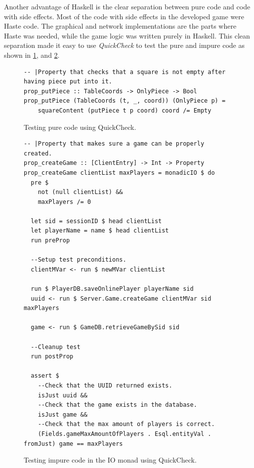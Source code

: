 \documentclass[a4paper]{article}
\begin{document}
Another advantage of Haskell is the clear separation between pure code and code with side effects. Most of the code with side effects in the developed game were Haste code. The graphical and network implementations are the parts where Haste was needed, while the game logic was written purely in Haskell. This clean separation made it easy to use \textit{QuickCheck} to test the pure and impure code as shown in \cref{fig:quickchecking}, and \cref{fig:quickcheck-monadic}.

\begin{figure}[ht!]
    \begin{lstlisting}
-- |Property that checks that a square is not empty after having piece put into it.
prop_putPiece :: TableCoords -> OnlyPiece -> Bool
prop_putPiece (TableCoords (t, _, coord)) (OnlyPiece p) =
    squareContent (putPiece t p coord) coord /= Empty
    \end{lstlisting}
    \caption{Testing pure code using QuickCheck.}
    \label{fig:quickchecking}
\end{figure}    

\begin{figure}[ht!]
    \begin{lstlisting}
-- |Property that makes sure a game can be properly created.
prop_createGame :: [ClientEntry] -> Int -> Property
prop_createGame clientList maxPlayers = monadicIO $ do
  pre $
    not (null clientList) &&
    maxPlayers /= 0

  let sid = sessionID $ head clientList
  let playerName = name $ head clientList
  run preProp

  --Setup test preconditions.
  clientMVar <- run $ newMVar clientList

  run $ PlayerDB.saveOnlinePlayer playerName sid
  uuid <- run $ Server.Game.createGame clientMVar sid maxPlayers

  game <- run $ GameDB.retrieveGameBySid sid

  --Cleanup test
  run postProp

  assert $
    --Check that the UUID returned exists.
    isJust uuid &&
    --Check that the game exists in the database.
    isJust game &&
    --Check that the max amount of players is correct.
    (Fields.gameMaxAmountOfPlayers . Esql.entityVal . fromJust) game == maxPlayers
    \end{lstlisting}
    \caption{Testing impure code in the IO monad using QuickCheck.}
    \label{fig:quickcheck-monadic}
\end{figure}
\end{document}
